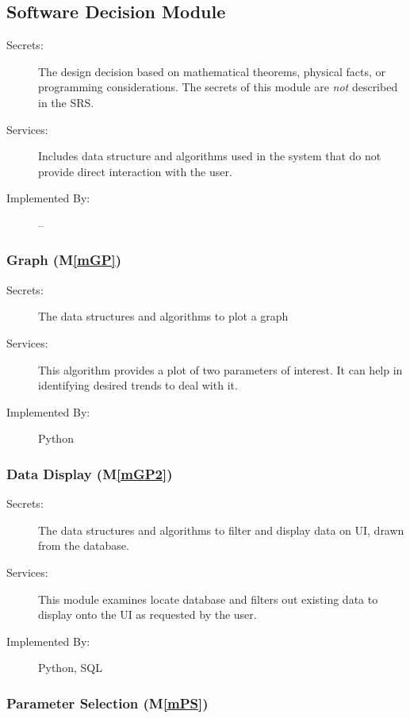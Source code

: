 \documentclass[12pt, titlepage]{article}
\newcommand{\mref}[1]{M\ref{#1}}
\begin{document}
\subsection{Software Decision Module}

\begin{description}
  \item[Secrets:] The design decision based on mathematical theorems, physical
    facts, or programming considerations. The secrets of this module are
    \emph{not} described in the SRS.
  \item[Services:] Includes data structure and algorithms used in the system that
    do not provide direct interaction with the user.
  \item[Implemented By:] --
\end{description}

\subsubsection{Graph (\mref{mGP})}

\begin{description}
  \item[Secrets:] The data structures and algorithms to plot a graph
  \item[Services:] This algorithm provides a plot of two parameters of interest. It can help in identifying desired trends to deal with it.
  \item[Implemented By:] Python
\end{description}

\subsubsection{Data Display (\mref{mGP2})}

\begin{description}
  \item[Secrets:] The data structures and algorithms to filter and display data on UI, drawn from the database.
  \item[Services:] This module examines locate database and filters out existing data to display onto the UI as requested by the user. 
  \item[Implemented By:] Python, SQL
\end{description}

\subsubsection{Parameter Selection (\mref{mPS})}
\end{document}
